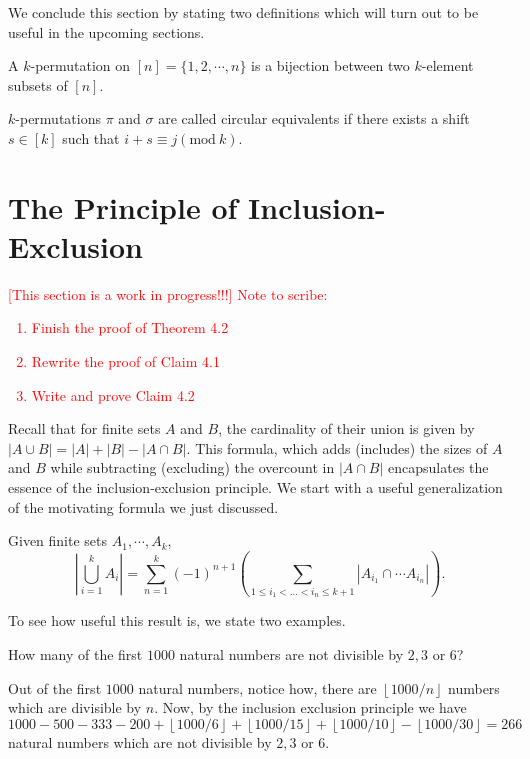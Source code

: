 We conclude this section by stating two definitions which will turn out to be useful in the upcoming sections.
\begin{definition}[$k$-Permutation]
A $k$-permutation on $[n]=\{1,2,\cdots,n\}$ is a bijection between two $k$-element subsets of $[n]$. 
\end{definition}
\begin{definition}
	$k$-permutations  $\pi$ and $\sigma$ are called circular equivalents if there exists a shift  $s\in [k]$ such that  $i+s\equiv j(\text{mod} \ k)$.
\end{definition}
\section{The Principle of Inclusion-Exclusion}
\textcolor{red}{
[This section is a work in progress!!!] Note to scribe:
\begin{enumerate}
    \item Finish the proof of Theorem 4.2
    \item Rewrite the proof of Claim 4.1
    \item Write and prove Claim 4.2
\end{enumerate}
}
Recall that for finite sets $A$ and $B$, the cardinality of their union is given by $|A \cup B| = |A| + |B| - |A \cap B|
$. This formula, which adds (includes) the sizes of $A$ and $B$ while subtracting (excluding) the overcount in $|A \cap B|$ encapsulates the essence of the inclusion-exclusion principle. We start with a useful generalization of the motivating formula we just discussed.
\begin{theorem}
	Given finite sets $A_{1},\cdots,A_{k}$, 
	\[
		|\bigcup_{i=1}^k A_i| = \sum_{n=1}^{k}\left(-1  \right)^{n+1}\left( \sum_{1\leq i_{1}<\ldots<i_{n}\leq k+1}|A_{i_{1}}\cap \cdots A_{i_{n}}| \right) 
	.\] 
 \label{t:4.1}
\end{theorem}
To see how useful this result is, we state two examples.
\begin{question}
How many of the first $1000$ natural numbers are not divisible by $2,3$ or $6$? \label{q:4.1}
\end{question}
\begin{solution}
Out of the first $1000$ natural numbers, notice how, there are $\left \lfloor{1000/n}\right \rfloor$ numbers which are divisible by $n$. Now, by the inclusion exclusion principle we have 
\[
1000-500-333-200+\left \lfloor{1000/6}\right \rfloor+\left \lfloor{1000/15}\right \rfloor+\left \lfloor{1000/10}\right \rfloor-\left \lfloor{1000/30}\right \rfloor=266
\]
natural numbers which are not divisible by $2,3$ or $6$. 
\end{solution}

